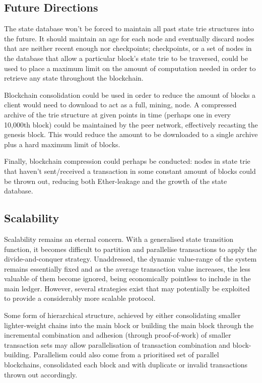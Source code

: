 \documentclass[9pt,oneside]{amsart}
\begin{document}
\begin{multicols}{2}
\section{Future Directions} \label{ch:future}

The state database won't be forced to maintain all past state trie structures into the future. It should maintain an age for each node and eventually discard nodes that are neither recent enough nor checkpoints; checkpoints, or a set of nodes in the database that allow a particular block's state trie to be traversed, could be used to place a maximum limit on the amount of computation needed in order to retrieve any state throughout the blockchain.

Blockchain consolidation could be used in order to reduce the amount of blocks a client would need to download to act as a full, mining, node. A compressed archive of the trie structure at given points in time (perhaps one in every 10,000th block) could be maintained by the peer network, effectively recasting the genesis block. This would reduce the amount to be downloaded to a single archive plus a hard maximum limit  of blocks.

Finally, blockchain compression could perhaps be conducted: nodes in state trie that haven't sent/received a transaction in some constant amount of blocks could be thrown out, reducing both Ether-leakage and the growth of the state database.

\subsection{Scalability}

Scalability remains an eternal concern. With a generalised state transition function, it becomes difficult to partition and parallelise transactions to apply the divide-and-conquer strategy. Unaddressed, the dynamic value-range of the system remains essentially fixed and as the average transaction value increases, the less valuable of them become ignored, being economically pointless to include in the main ledger. However, several strategies exist that may potentially be exploited to provide a considerably more scalable protocol.

Some form of hierarchical structure, achieved by either consolidating smaller lighter-weight chains into the main block or building the main block through the incremental combination and adhesion (through proof-of-work) of smaller transaction sets may allow parallelisation of transaction combination and block-building. Parallelism could also come from a prioritised set of parallel blockchains, consolidated each block and with duplicate or invalid transactions thrown out accordingly.


\end{multicols}
\end{document}
